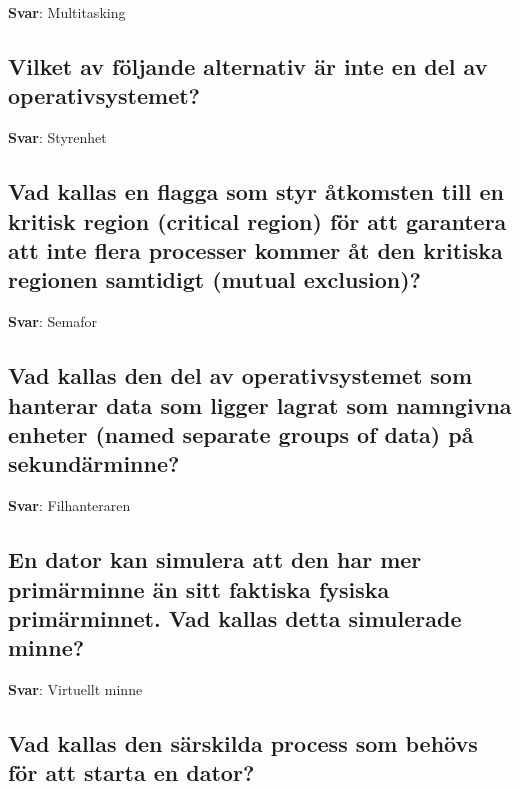 \documentclass[a4paper,11pt,oneside]{article}
\begin{document}
\begin{sloppypar}
\label{q:10:sa:sv:True}

\textbf{Svar}: Multitasking



\subsection{Vilket av f\"oljande alternativ \"ar inte en del av operativsystemet?}

\label{q:11:sa:sv:True}

\textbf{Svar}: Styrenhet



\subsection{Vad kallas en flagga som styr \r{a}tkomsten till en kritisk region (critical region) f\"or att garantera att inte flera processer kommer \r{a}t den kritiska regionen samtidigt (mutual exclusion)?}

\label{q:12:sa:sv:True}

\textbf{Svar}: Semafor



\subsection{Vad kallas den del av operativsystemet som hanterar data som ligger lagrat som namngivna enheter (named separate groups of data) p\r{a} sekund\"arminne?}

\label{q:13:sa:sv:True}

\textbf{Svar}: Filhanteraren



\subsection{En dator kan simulera att den har mer prim\"arminne \"an sitt faktiska fysiska prim\"arminnet. Vad kallas detta simulerade minne?}

\label{q:14:sa:sv:True}

\textbf{Svar}: Virtuellt minne



\subsection{Vad kallas den s\"arskilda process som beh\"ovs f\"or att starta en dator?}

\label{q:15:sa:sv:True}


\end{sloppypar}
\end{document}
